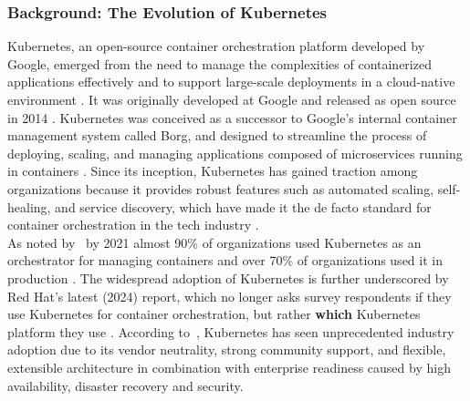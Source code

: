 \documentclass[11pt, a4paper, oneside, listof=totoc]{scrartcl}
\begin{document}
            \subsubsection{Background: The Evolution of Kubernetes}\label{subsubsec:k8sEvolution}
                Kubernetes, an open-source container orchestration platform developed by Google,
                emerged from the need to manage the complexities of containerized applications
                effectively and to support large-scale deployments in a cloud-native environment
                \parencites{googlecloudWhatIsKubernetes}{kubernetesOverview}.
                It was originally developed at Google and released as open source in 2014
                \parencite{googlecloudWhatIsKubernetes}.
                Kubernetes was conceived as a successor to Google's internal container
                management system called Borg, and designed to streamline the process of deploying,
                scaling, and managing applications composed of microservices running in containers
                \parencites[pp.~13--14]{verma2015}[p.~84]{bernstein2014}.
                Since its inception, Kubernetes has gained traction among organizations because it
                provides robust features such as automated scaling,
                self-healing, and service discovery, which have made it the de facto standard for
                container orchestration in the tech industry
                \parencite[pp.~855--858]{damarapati2025}.
                \\
                As noted by~\cite[p.~457]{moravcik2022} by 2021 almost 90\% of organizations used
                Kubernetes as an orchestrator for managing containers and over 70\% of organizations
                used it in production \parencite{redhatStateOfK8sSecurityReport2021}.
                The widespread adoption of Kubernetes is further underscored by Red Hat's latest
                (2024) report, which no longer asks survey respondents if they use Kubernetes for
                container orchestration, but rather \textbf{which} Kubernetes platform they use
                \parencite[p.~27]{redhatStateOfK8sSecurityReport2024}.
                According to~\cite[pp.~855--856]{damarapati2025}, Kubernetes has seen
                unprecedented industry adoption due to its vendor neutrality, strong community
                support, and flexible, extensible architecture in combination with enterprise
                readiness caused by high availability, disaster recovery and security.
                \\
\end{document}
